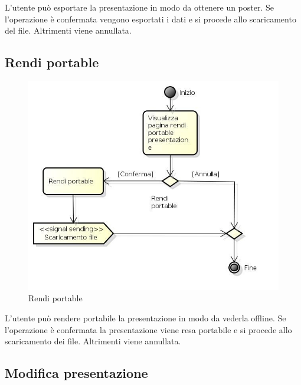 L'utente può esportare la presentazione in modo da ottenere un poster. Se l'operazione è confermata vengono esportati i dati e si procede allo scaricamento del file. Altrimenti viene annullata.

\subsection{Rendi portable}

\begin{figure}[h!]
		\centering
		\includegraphics[scale=.2]{img/Rendi_portable.jpg}
		\caption{Rendi portable}
		\label{fig:ModelloSpy}
\end{figure}

L'utente può rendere portabile la presentazione in modo da vederla offline. Se l'operazione è confermata la presentazione viene resa portabile e si procede allo scaricamento dei file. Altrimenti viene annullata.

\subsection{Modifica presentazione}

